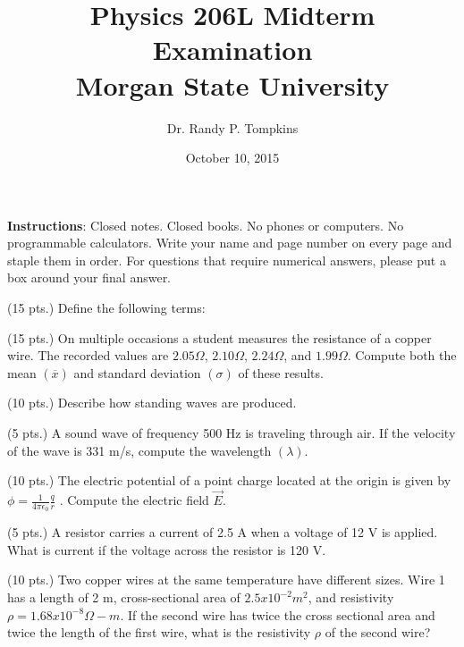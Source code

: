 \documentclass[12pt]{article}
\begin{document}
\title{Physics 206L Midterm Examination\\
       Morgan State University\\}
\author{Dr. Randy P. Tompkins}
\date{October 10, 2015}

\maketitle

\noindent
\textbf{Instructions}: Closed notes. Closed books. No phones or computers. No programmable calculators. Write your name and page number on every page and staple them in order. For questions that require numerical answers, please put a box around your final answer. 


\begin{enumerate}

	\item{(15 pts.) Define the following terms:}
  
  \item{(15 pts.) On multiple occasions a student measures the resistance of a copper wire. The recorded values are $2.05\Omega$, $2.10\Omega$, $2.24\Omega$, and $1.99\Omega$. Compute both the mean $(\overline{x}) $ and standard deviation $ (\sigma) $ of these results.
  
  \item{(10 pts.) Describe how standing waves are produced.}
  
  \item{(5 pts.) A sound wave of frequency 500 Hz is traveling through air. If the velocity of the wave is 331 m/s, compute the wavelength $ (\lambda) $.}
  
  \item{(10 pts.) The electric potential of a point charge located at the origin is given by $ \phi = \frac{1}{4 \pi \epsilon_{0}} \frac{q}{r} $ . Compute the electric field $ \vec{E} $.}
  
  \item{(5 pts.) A resistor carries a current of 2.5 A when a voltage of 12 V is applied. What is current if the voltage across the resistor is 120 V.}
  
  \item{(10 pts.) Two copper wires at the same temperature have different sizes. Wire 1 has a length of 2 m, cross-sectional area of $2.5 x 10^{-2} m^{2}$, and resistivity $\rho = 1.68 x 10^{-8} \Omega-m $. If the second wire has twice the cross sectional area and twice the length of the first wire, what is the resistivity $\rho$ of the second wire?}
  
}
\end{enumerate}
\end{document}
